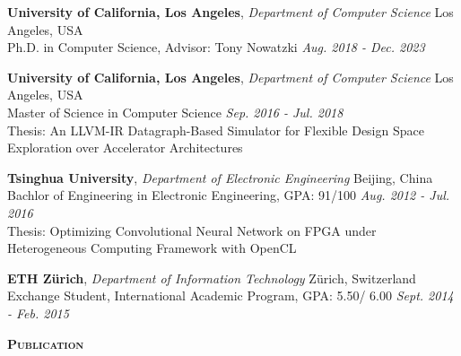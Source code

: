 \documentclass[a4paper]{article}
\newenvironment{changemargin}[2]{%
  \begin{list}{}{%
    \setlength{\topsep}{0pt}%
    \setlength{\leftmargin}{#1}%
    \setlength{\rightmargin}{#2}%
    \setlength{\listparindent}{\parindent}%
    \setlength{\itemindent}{\parindent}%
    \setlength{\parsep}{\parskip}%
  }%
  \item[]}{\end{list}
}
\newcommand{\lineover}{
	\begin{changemargin}{-0.05in}{-0.05in}
		\vspace*{-8pt}
		\hrulefill \\
		\vspace*{-2pt}
	\end{changemargin}
}
\newcommand{\header}[1]{
	\begin{changemargin}{-0.5in}{-0.5in}
		\scshape{\large \textbf{#1}}\\
  	\lineover
	\end{changemargin}
}
\newenvironment{body} {
	\vspace*{-16pt}
	\begin{changemargin}{-0.5in}{-0.5in}
  }	
	{\end{changemargin}
}
\begin{document}
\begin{body}
	\vspace{14pt}

	\textbf{University of California, Los Angeles}, \emph{Department of Computer Science} \hfill Los Angeles, USA \\
Ph.D. in Computer Science, Advisor: Tony Nowatzki \hfill \emph{Aug. 2018 - Dec. 2023} {} \\

\vspace{6pt}

	\textbf{University of California, Los Angeles}, \emph{Department of Computer Science} \hfill Los Angeles, USA \\
Master of Science in Computer Science \hfill \emph{Sep. 2016 - Jul. 2018}{} \\
Thesis: An LLVM-IR Datagraph-Based Simulator for Flexible Design Space Exploration over Accelerator Architectures \\

\vspace{6pt}

	\textbf{Tsinghua University}, \emph{Department of Electronic Engineering} \hfill Beijing, China \\
Bachlor of Engineering in Electronic Engineering, GPA: 91/100 \hfill \emph{Aug. 2012 - Jul. 2016}{} \\
Thesis: Optimizing Convolutional Neural Network on FPGA under Heterogeneous Computing Framework with OpenCL \\
\vspace{6pt}

	\textbf{ETH Z\"urich}, \emph{Department of Information Technology} \hfill Z\"urich, Switzerland \\
	Exchange Student, International Academic Program, GPA: 5.50/ 6.00 \hfill \emph{Sept. 2014 - Feb. 2015}{} \\

\end{body}

\smallskip
\smallskip

\header{Publication}
\end{document}
